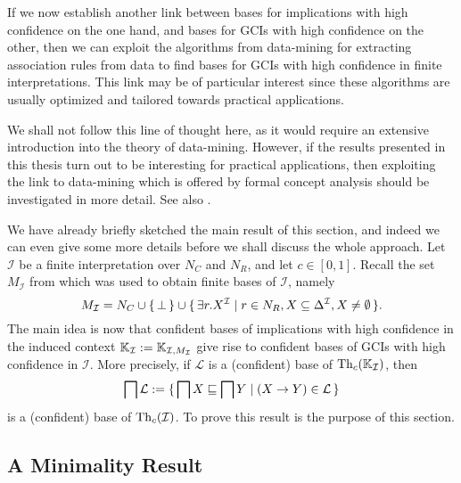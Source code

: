 If we now establish another link between bases for implications with high confidence on
the one hand, and bases for GCIs with high confidence on the other, then we can exploit
the algorithms from data-mining for extracting association rules from data to find bases
for GCIs with high confidence in finite interpretations.  This link may be of particular
interest since these algorithms are usually optimized and tailored towards practical
applications.

We shall not follow this line of thought here, as it would require an extensive
introduction into the theory of data-mining.  However, if the results presented in this
thesis turn out to be interesting for practical applications, then exploiting the link to
data-mining which is offered by formal concept analysis should be investigated in more
detail.  See also .

We have already briefly sketched the main result of this section, and indeed we can even
give some more details before we shall discuss the whole approach.  Let $\mathcal{I}$ be a
finite interpretation over $N_C$ and $N_R$, and let $c \in [0,1]$.  Recall the set
$M_{\mathcal{I}}$ from  which was used to obtain finite bases of
$\mathcal{I}$, namely
\begin{equation*}
  M_{\mathcal{I}} = N_C \cup {\ensuremath{\{\, \bot \,\}}} \cup {\ensuremath{\{\, \exists r. X^{\mathcal{I}} \mid r \in
    N_R, X \subseteq \Delta^{\mathcal{I}}, X \neq \emptyset \,\}}}.
\end{equation*}
The main idea is now that confident bases of implications with high confidence in the
induced context ${\mathbb{K}}_{\mathcal{I}} := {\mathbb{K}}_{\mathcal{I}, M_{\mathcal{I}}}$ give rise
to confident bases of GCIs with high confidence in $\mathcal{I}$.  More precisely, if
$\mathcal{L}$ is a (confident) base of $\operatorname{Th}_c({\mathbb{K}}_{\mathcal{I}})$, then
\begin{equation*}
  \bigsqcap \mathcal{L} := {\{\, \bigsqcap X \sqsubseteq \bigsqcap Y \mid (X \to Y) \in
    \mathcal{L} \,\}}
\end{equation*}
is a (confident) base of $\operatorname{Th}_c(\mathcal{I})$.  To prove this result is the purpose of
this section.

%

\subsection{A Minimality Result}
\label{sec:minimality-result}

